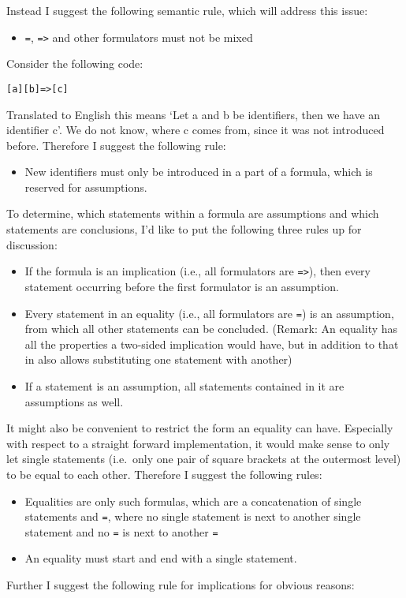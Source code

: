 \documentclass[british]{article}
\newcommand\prv{bc}
\newcommand\m[1]{\texttt{#1}}
\begin{document}
Instead I suggest the following semantic rule, which will address
this issue:
\begin{itemize}
\item \m{=}, \m{=>} and other formulators must not be mixed
\end{itemize}
\medskip{}

Consider the following code:

\begin{verbatim}
[a][b]=>[c]
\end{verbatim}

Translated to English this means `Let a and b be identifiers, then
we have an identifier c'. We do not know, where c comes from, since
it was not introduced before. Therefore I suggest the following rule:
\begin{itemize}
	\item
		New identifiers must only be introduced in a part of a formula, which
		is reserved for assumptions.
\end{itemize}
\medskip{}

To determine, which statements within a formula are assumptions and
which statements are conclusions, I'd like to put the following three
rules up for discussion:
\begin{itemize}
	\item
		If the formula is an implication (i.e., all formulators are \m{=>}),
		then every statement occurring before the first formulator is an
		assumption.
	\item
		Every statement in an equality (i.e., all formulators are \m{=}) is an
		assumption, from which all other statements can be concluded.  (Remark:
		An equality has all the properties a two-sided implication would
		have, but in addition to that in also allows substituting one
		statement with another)
	\item
		If a statement is an assumption, all statements contained in it are
		assumptions as well.
	\end{itemize}
\medskip{}

It might also be convenient to restrict the form an equality can have.
Especially with respect to a straight forward implementation, it would
make sense to only let single statements (i.e.\ only one pair of square
brackets at the outermost level) to be equal to each other. Therefore
I suggest the following rules:
\begin{itemize}
	\item
		Equalities are only such formulas, which are a concatenation of single
		statements and \m{=}, where no single statement is next to another
		single statement and no \m{=} is next to another \m{=}
	\item
		An equality must start and end with a single statement.
\end{itemize}
\medskip{}
Further I suggest the following rule for implications for obvious
reasons:
\end{document}

